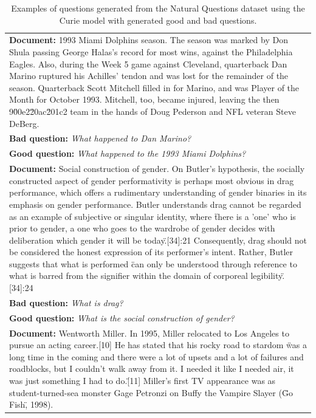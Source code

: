\documentclass[11pt]{article}
\begin{document}
\begin{table}[htbp!]
 \begin{small}
\setlength\tabcolsep{6pt}
 \caption{Examples of questions generated from the Natural Questions dataset using the Curie model with generated good and bad questions.}
 \label{tab:examples_nq}
\begin{tabularx}{\textwidth}{X}
\toprule
\textbf{\textcolor{blu}{Document:}} {\footnotesize 1993 Miami Dolphins season. The season was marked by Don Shula passing George Halas's record for most wins, against the Philadelphia Eagles. Also, during the Week 5 game against Cleveland, quarterback Dan Marino ruptured his Achilles' tendon and was lost for the remainder of the season. Quarterback Scott Mitchell filled in for Marino, and was Player of the Month for October 1993. Mitchell, too, became injured, leaving the then 9\u00e2\u20ac\u201c2 team in the hands of Doug Pederson and NFL veteran Steve DeBerg.} \\
\textbf{\textcolor{orng}{Bad question:}} \textit{What happened to Dan Marino?}  \\ 
\textbf{\textcolor{rd}{Good question:}}  \textit{What happened to the 1993 Miami Dolphins?}  \\
\midrule
\textbf{\textcolor{blu}{Document:}} {\footnotesize Social construction of gender. On Butler's hypothesis, the socially constructed aspect of gender performativity is perhaps most obvious in drag performance, which offers a rudimentary understanding of gender binaries in its emphasis on gender performance. Butler understands drag cannot be regarded as an example of subjective or singular identity, where \"there is a 'one' who is prior to gender, a one who goes to the wardrobe of gender decides with deliberation which gender it will be today\".[34]:21 Consequently, drag should not be considered the honest expression of its performer's intent. Rather, Butler suggests that what is performed \"can only be understood through reference to what is barred from the signifier within the domain of corporeal legibility\".[34]:24} \\
\textbf{\textcolor{orng}{Bad question:}} \textit{What is drag?}  \\ 
\textbf{\textcolor{rd}{Good question:}}  \textit{What is the social construction of gender?}  \\
\midrule
\textbf{\textcolor{blu}{Document:}} {\footnotesize Wentworth Miller. In 1995, Miller relocated to Los Angeles to pursue an acting career.[10] He has stated that his rocky road to stardom \"was a long time in the coming and there were a lot of upsets and a lot of failures and roadblocks, but I couldn't walk away from it. I needed it like I needed air, it was just something I had to do.\"[11] Miller's first TV appearance was as student-turned-sea monster Gage Petronzi on Buffy the Vampire Slayer (\"Go Fish\", 1998).} \\

\end{tabularx}
\end{small}
\end{table}
\end{document}
